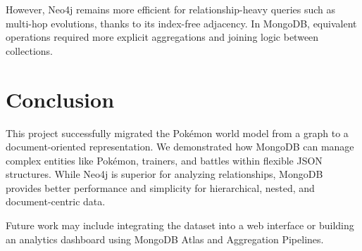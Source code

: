\documentclass[11pt]{article}
\begin{document}
    However, Neo4j remains more efficient for relationship-heavy queries such as multi-hop evolutions, thanks to its index-free adjacency.
    In MongoDB, equivalent operations required more explicit aggregations and joining logic between collections.

    \section{Conclusion}
    This project successfully migrated the Pokémon world model from a graph to a document-oriented representation.  
    We demonstrated how MongoDB can manage complex entities like Pokémon, trainers, and battles within flexible JSON structures.  
    While Neo4j is superior for analyzing relationships, MongoDB provides better performance and simplicity for hierarchical, nested, and document-centric data.

    Future work may include integrating the dataset into a web interface or building an analytics dashboard using MongoDB Atlas and Aggregation Pipelines.
\end{document}
